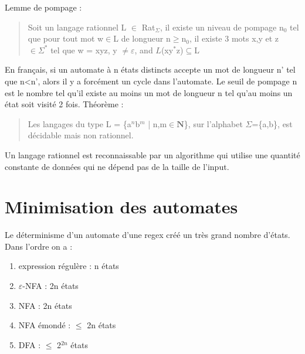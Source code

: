 \documentclass{article}
\begin{document}
Lemme de pompage :
\begin{quote}
    Soit un langage rationnel L $\in$ Rat$_{\Sigma}$, il existe un niveau de pompage n$_{0}$ tel que pour tout mot w$\in$L de longueur n$\geq$n$_{0}$, il existe 3 mots x,y et z $\in\Sigma^{*}$ tel que w = xyz, y $\neq\varepsilon$, and $L$(xy$^{*}$z)$\subseteq$L
\end{quote}
En français, si un automate à n états distincts accepte un mot de longueur n' tel que n<n', alors il y a forcément un cycle dans l'automate. Le seuil de pompage n est le nombre tel qu'il existe au moins un mot de longueur n tel qu'au moins un  état soit visité 2 fois.
\newline
Théorème :
\begin{quote}
    Les langages du type L = \{a$^{n}$b$^{m}$ | n,m$\in\mathbf{N}$\}, sur l'alphabet $\Sigma$=\{a,b\}, est décidable mais non rationnel.
\end{quote}

Un langage rationnel est reconnaissable par un algorithme qui utilise une quantité constante de données qui ne dépend pas de la taille de l'input.
\newpage

















\section{Minimisation des automates}
Le déterminisme d'un automate d'une regex créé un très grand nombre d'états. Dans l'ordre on a :
\begin{enumerate}
    \item expression régulère : n états
    \item $\varepsilon$-NFA : 2n états
    \item NFA : 2n états
    \item NFA émondé : $\leqslant$ 2n états
    \item DFA : $\leqslant$ 2$^{2n}$ états
\end{enumerate}
\end{document}
